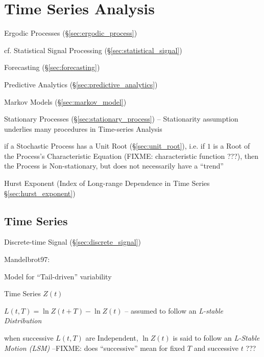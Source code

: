 \section{Time Series Analysis}\label{sec:time_series_analysis}


Ergodic Processes (\S\ref{sec:ergodic_process})

\fist cf. Statistical Signal Processing (\S\ref{sec:statistical_signal})

Forecasting (\S\ref{sec:forecasting})

Predictive Analytics (\S\ref{sec:predictive_analytics})

\fist Markov Models (\S\ref{sec:markov_model})

Stationary Processes (\S\ref{sec:stationary_process}) -- Stationarity assumption
underlies many procedures in Time-series Analysis

if a Stochastic Process has a Unit Root (\S\ref{sec:unit_root}), i.e. if $1$ is
a Root of the Process's Characteristic Equation (FIXME: characteristic function
???), then the Process is Non-stationary, but does not necessarily have a
``trend''

Hurst Exponent (Index of Long-range Dependence in Time Series
\S\ref{sec:hurst_exponent})



\subsection{Time Series}\label{sec:time_series}

Discrete-time Signal (\S\ref{sec:discrete_signal})

Mandelbrot97:


Model for ``Tail-driven'' variability

Time Series $Z(t)$

$L(t, T) = \ln Z(t+T) - \ln Z(t)$ -- assumed to follow an \emph{L-stable
  Distribution}

when successive $L(t, T)$ are Independent, $\ln Z(t)$ is said to follow an
\emph{L-Stable Motion (LSM)} --FIXME: does ``successive'' mean for fixed $T$ and
successive $t$ ???

